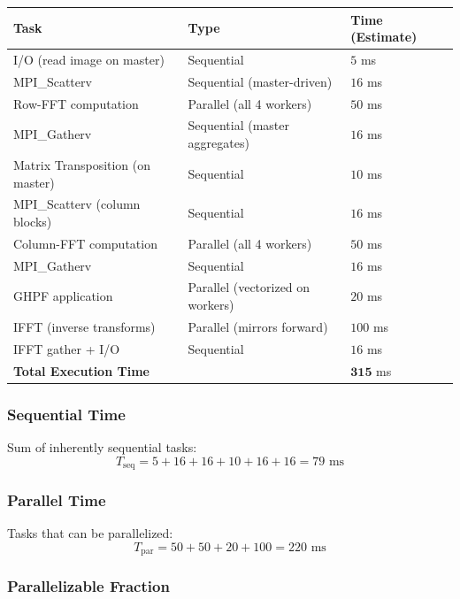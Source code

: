 \documentclass[11pt,a4paper]{article}
\theoremstyle{definition}
\begin{document}
\begin{table}[h]
    \centering
    \begin{tabular}{lll}
        \hline
        \textbf{Task} & \textbf{Type} & \textbf{Time (Estimate)} \\
        \hline
        I/O (read image on master) & Sequential & $5$ ms \\
        MPI\_Scatterv & Sequential (master-driven) & $16$ ms \\
        Row-FFT computation & Parallel (all 4 workers) & $50$ ms \\
        MPI\_Gatherv & Sequential (master aggregates) & $16$ ms \\
        Matrix Transposition (on master) & Sequential & $10$ ms \\
        MPI\_Scatterv (column blocks) & Sequential & $16$ ms \\
        Column-FFT computation & Parallel (all 4 workers) & $50$ ms \\
        MPI\_Gatherv & Sequential & $16$ ms \\
        GHPF application & Parallel (vectorized on workers) & $20$ ms \\
        IFFT (inverse transforms) & Parallel (mirrors forward) & $100$ ms \\
        IFFT gather + I/O & Sequential & $16$ ms \\
        \hline
        \textbf{Total Execution Time} & & $\mathbf{315}$ ms \\
        \hline
    \end{tabular}
\end{table}

\subsubsection{Sequential Time}

Sum of inherently sequential tasks:
\[
T_{\text{seq}} = 5 + 16 + 16 + 10 + 16 + 16 = 79 \text{ ms}
\]

\subsubsection{Parallel Time}

Tasks that can be parallelized:
\[
T_{\text{par}} = 50 + 50 + 20 + 100 = 220 \text{ ms}
\]

\subsubsection{Parallelizable Fraction}
\end{document}
